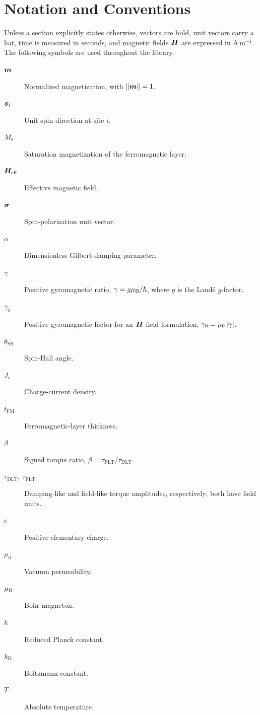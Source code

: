 \section{Notation and Conventions}

Unless a section explicitly states otherwise, vectors are bold, unit vectors carry a
hat, time is measured in seconds, and magnetic fields $\bm{H}$ are expressed in
$\mathrm{A\,m^{-1}}$.  The following symbols are used throughout the library.

\begin{description}
    \item[$\bm{m}$] Normalized magnetization, with $\left\lVert \bm{m} \right\rVert=1$.
    \item[$\bm{s}_i$] Unit spin direction at site $i$.
    \item[$M_{\mathrm{s}}$] Saturation magnetization of the ferromagnetic layer.
    \item[$\bm{H}_{\mathrm{eff}}$] Effective magnetic field.
    \item[$\bm{\sigma}$] Spin-polarization unit vector.
    \item[$\alpha$] Dimensionless Gilbert damping parameter.
    \item[$\gamma$] Positive gyromagnetic ratio, $\gamma=g\mu_{\mathrm{B}}/\hbar$, where $g$
        is the Land\'e $g$-factor.
    \item[$\gamma_0$] Positive gyromagnetic factor for an $\bm{H}$-field formulation,
        $\gamma_0=\mu_0\left\lvert \gamma \right\rvert$.
    \item[$\theta_{\mathrm{SH}}$] Spin-Hall angle.
    \item[$J_c$] Charge-current density.
    \item[$t_{\mathrm{FM}}$] Ferromagnetic-layer thickness.
    \item[$\beta$] Signed torque ratio,
        $\beta=\tau_{\mathrm{FLT}}/\tau_{\mathrm{DLT}}$.
    \item[$\tau_{\mathrm{DLT}}$, $\tau_{\mathrm{FLT}}$] Damping-like and
        field-like torque amplitudes, respectively; both have field units.
    \item[$e$] Positive elementary charge.
    \item[$\mu_0$] Vacuum permeability.
    \item[$\mu_{\mathrm{B}}$] Bohr magneton.
    \item[$\hbar$] Reduced Planck constant.
    \item[$k_{\mathrm{B}}$] Boltzmann constant.
    \item[$T$] Absolute temperature.
\end{description}

